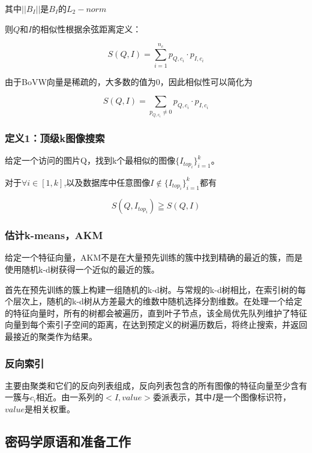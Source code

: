 \documentclass{article}
\begin{document}
其中$||B_I||$是$B_I$的$L_2-norm$

则$Q$和$I$的相似性根据余弦距离定义：

\begin{equation}
    S(Q,I) = \sum^{n_c}_{i=1}p_{Q,c_i} \cdot p_{I,c_i}
\end{equation}

由于BoVW向量是稀疏的，大多数的值为0，因此相似性可以简化为

\begin{equation}
    S(Q,I) = \sum_{p_{Q,c_i}\neq 0} p_{Q,c_i} \cdot p_{I,c_i}
\end{equation}


\subsubsection{定义1：顶级k图像搜索}

给定一个访问的图片Q，找到k个最相似的图像$\{I_{top_i}\}^k_{i=1}$。

对于$\forall i \in [1,k]$,以及数据库中任意图像$I \notin \{I_{top_i}\}^k_{i=1}$都有

$$
S(Q,I_{top_i}) \geqq S(Q,I)
$$

\subsubsection{估计k-means，AKM}

给定一个特征向量，AKM不是在大量预先训练的簇中找到精确的最近的簇，而是使用随机k-d树获得一个近似的最近的簇。

首先在预先训练的簇上构建一组随机的k-d树。与常规的k-d树相比，在索引树的每个层次上，随机的k-d树从方差最大的维数中随机选择分割维数。在处理一个给定的特征向量时，所有的树都会被遍历，直到叶子节点，该全局优先队列维护了特征向量到每个索引子空间的距离，在达到预定义的树遍历数后，将终止搜索，并返回最接近的聚类作为结果。


\subsubsection{反向索引}

主要由聚类和它们的反向列表组成，反向列表包含的所有图像的特征向量至少含有一簇与$c_i$相近。由一系列的$<I,value>$委派表示，其中$I$是一个图像标识符，$value$是相关权重。


\subsection{密码学原语和准备工作}
\end{document}
